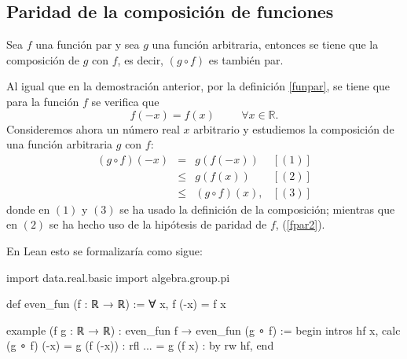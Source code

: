 \subsection{Paridad de la composición de funciones}
\begin{teorema}
  Sea \(f\) una función par y sea \(g\) una función arbitraria,
  entonces se tiene que la composición de \(g\) con \(f\),
  es decir, \((g ∘ f)\) es también par.
\end{teorema}
\begin{demostracion}
  Al igual que en la demostración anterior, por
  la definición \ref{funpar}, se tiene que para la
  función \(f\) se verifica que
  \begin{equation}\label{fpar2}
  f(-x)=f(x) \hspace{1cm}∀ x ∈ ℝ.
  \end{equation}
  Consideremos ahora un número real \(x\) arbitrario y estudiemos
  la composición de una función arbitraria \(g\) con \(f\):
  \[\begin{array}{llll}
  	(g ∘ f)(-x) &= &g(f(-x))   & [(1)]\\
                    &≤ &g(f(x)) & [(2)] \\
                    &≤ &(g ∘ f)(x),& [(3)] 
  \end{array}\]
  donde en \((1)\) y \((3)\) se ha usado la definición de la composición;
  mientras que en \((2)\) se ha hecho uso de la hipótesis de paridad
  de \(f\), (\ref{fpar2}).
\end{demostracion}

En Lean esto se formalizaría como sigue:
\begin{leancode}
import data.real.basic
import algebra.group.pi

def even_fun (f : ℝ → ℝ) := ∀ x, f (-x) = f x

example (f g : ℝ → ℝ) : even_fun f → even_fun (g ∘ f) :=
begin
intros hf x,
calc (g ∘ f) (-x)
    = g (f (-x)) : rfl
... = g (f x)    : by rw hf,
end
\end{leancode}

